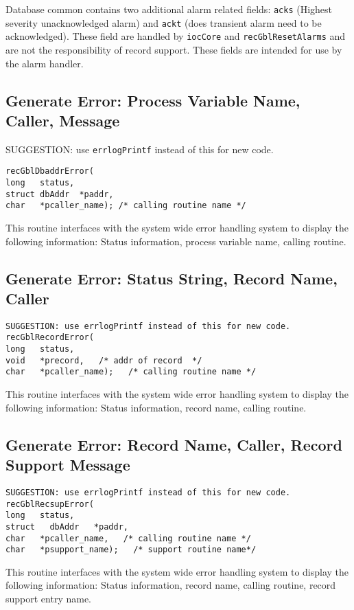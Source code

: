 Database common contains two additional alarm related fields: \verb|acks| (Highest severity unacknowledged alarm) and 
\verb|ackt| (does transient alarm need to be acknowledged). These field are handled by \verb|iocCore| and \verb|recGblResetAlarms| 
and are not the responsibility of record support. These fields are intended for use by the alarm handler.

\subsection{Generate Error: Process Variable Name, Caller, Message}

SUGGESTION: use \verb|errlogPrintf| instead of this for new code.

\begin{verbatim}recGblDbaddrError(
long   status,
struct dbAddr  *paddr,
char   *pcaller_name); /* calling routine name */
\end{verbatim}This routine interfaces with the system wide error handling system to display the following information: Status 
information, process variable name, calling routine.

\subsection{Generate Error: Status String, Record Name, Caller}

\begin{verbatim}SUGGESTION: use errlogPrintf instead of this for new code.
recGblRecordError(
long   status,
void   *precord,   /* addr of record  */
char   *pcaller_name);   /* calling routine name */
\end{verbatim}
This routine interfaces with the system wide error handling system to display the following information: Status 
information, record name, calling routine.

\subsection{Generate Error: Record Name, Caller, Record Support Message}

\begin{verbatim}SUGGESTION: use errlogPrintf instead of this for new code.
recGblRecsupError(
long   status,
struct   dbAddr   *paddr,
char   *pcaller_name,   /* calling routine name */
char   *psupport_name);   /* support routine name*/
\end{verbatim}
This routine interfaces with the system wide error handling system to display the following information: Status 
information, record name, calling routine, record support entry name.

